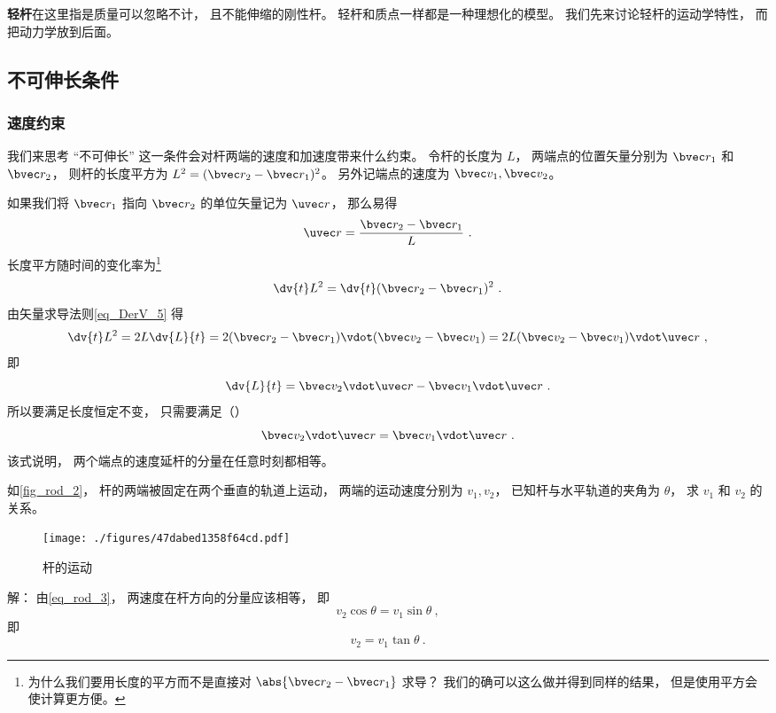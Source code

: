 

\textbf{轻杆}在这里指是质量可以忽略不计， 且不能伸缩的刚性杆。 轻杆和质点一样都是一种理想化的模型。 我们先来讨论轻杆的运动学特性， 而把动力学放到后面。

\subsection{不可伸长条件}
\subsubsection{速度约束}
我们来思考 “不可伸长” 这一条件会对杆两端的速度和加速度带来什么约束。 令杆的长度为 $L$， 两端点的位置矢量分别为 $\bvec r_1$ 和 $\bvec r_2$， 则杆的长度平方为 $L^2 = (\bvec r_2 - \bvec r_1)^2$。 另外记端点的速度为 $\bvec v_1, \bvec v_2$。

如果我们将 $\bvec r_1$ 指向 $\bvec r_2$ 的单位矢量记为 $\uvec r$， 那么易得
\begin{equation}\label{eq_rod_7}
\uvec r = \frac{\bvec r_2 - \bvec r_1}{L}~.
\end{equation}
长度平方随时间的变化率为\footnote{为什么我们要用长度的平方而不是直接对 $\abs{\bvec r_2 - \bvec r_1}$ 求导？ 我们的确可以这么做并得到同样的结果， 但是使用平方会使计算更方便。}
\begin{equation}\label{eq_rod_2}
\dv{t} L^2 = \dv{t} (\bvec r_2 - \bvec r_1)^2~.
\end{equation}
由矢量求导法则\autoref{eq_DerV_5} 得
\begin{equation}\label{eq_rod_1}
\dv{t} L^2 = 2L \dv{L}{t} = 2 (\bvec r_2 - \bvec r_1) \vdot (\bvec v_2 - \bvec v_1) = 2L (\bvec v_2 - \bvec v_1) \vdot \uvec r~,
\end{equation}
即
\begin{equation}\label{eq_rod_6}
\dv{L}{t} = \bvec v_2 \vdot \uvec r - \bvec v_1 \vdot \uvec r~.
\end{equation}
所以要满足长度恒定不变， 只需要满足（）
\begin{equation}\label{eq_rod_3}
\bvec v_2 \vdot \uvec r = \bvec v_1 \vdot \uvec r~.
\end{equation}
该式说明， 两个端点的速度延杆的分量在任意时刻都相等。

\begin{example}{}\label{ex_rod_1}
如\autoref{fig_rod_2}， 杆的两端被固定在两个垂直的轨道上运动， 两端的运动速度分别为 $v_1, v_2$， 已知杆与水平轨道的夹角为 $\theta$， 求 $v_1$ 和 $v_2$ 的关系。
\begin{figure}[ht]
\centering
\texttt{[image: ./figures/47dabed1358f64cd.pdf]}
\caption{杆的运动} \label{fig_rod_1}
\end{figure}
解： 由\autoref{eq_rod_3}， 两速度在杆方向的分量应该相等， 即
\begin{equation}
v_2 \cos\theta = v_1 \sin\theta~,
\end{equation}
即
\begin{equation}
v_2 = v_1 \tan\theta~.
\end{equation}
\end{example}


